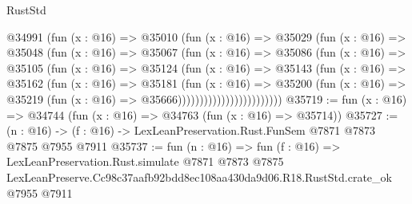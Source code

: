 \begin{lexlean}{RustStd}
\begin{coremodule}
                        @34991
                          (fun (x : @16) =>
                          @35010
                            (fun (x : @16) =>
                            @35029
                              (fun (x : @16) =>
                              @35048
                                (fun (x : @16) =>
                                @35067
                                  (fun (x : @16) =>
                                  @35086
                                    (fun (x : @16) =>
                                    @35105
                                      (fun (x : @16) =>
                                      @35124
                                        (fun (x : @16) =>
                                        @35143
                                          (fun (x : @16) =>
                                          @35162
                                            (fun (x : @16) =>
                                            @35181
                                              (fun (x : @16) =>
                                              @35200
                                                (fun (x : @16) =>
                                                @35219
                                                  (fun (x : @16) => @35666))))))))))))))))))))))))
@35719 := fun (x : @16) => @34744 (fun (x : @16) => @34763 (fun (x : @16) => @35714))
@35727 := (n : @16) -> (f : @16) -> LexLeanPreservation.Rust.FunSem @7871 @7873 @7875 @7955 @7911
@35737 := fun (n : @16) =>
  fun (f : @16) =>
  LexLeanPreservation.Rust.simulate
    @7871
    @7873
    @7875
    LexLeanPreserve.Cc98c37aafb92bdd8ec108aa430da9d06.R18.RustStd.crate_ok
    @7955
    @7911
\end{coremodule}
\end{lexlean}

